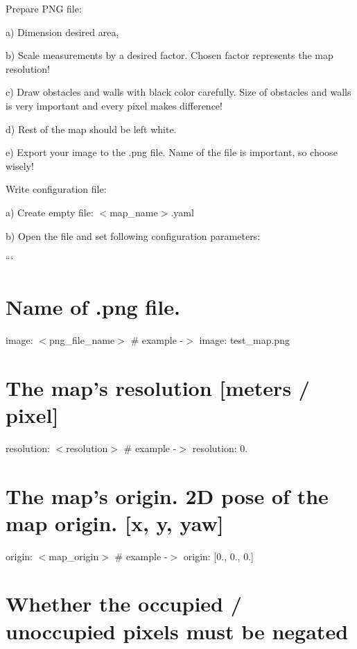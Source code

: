 \begin{DoxyEnumerate}
\item Prepare P\-N\-G file\-:\par
 a) Dimension desired area,\par
 b) Scale measurements by a desired factor. Chosen factor represents the map resolution! \par
 c) Draw obstacles and walls with black color carefully. Size of obstacles and walls is very important and every pixel makes difference!\par
 d) Rest of the map should be left white.\par
 e) Export your image to the .png file. Name of the file is important, so choose wisely!\par

\item Write configuration file\-:\par
 a) Create empty file\-: {\ttfamily $<$map\-\_\-name$>$.yaml}\par
 b) Open the file and set following configuration parameters\-:\par

\end{DoxyEnumerate}

``` \section*{Name of .png file.}

image\-: $<$png\-\_\-file\-\_\-name$>$ \# example -\/$>$ image\-: test\-\_\-map.\-png

\section*{The map's resolution \mbox{[}meters / pixel\mbox{]}}

resolution\-: $<$resolution$>$ \# example -\/$>$ resolution\-: 0.

\section*{The map's origin. 2\-D pose of the map origin. \mbox{[}x, y, yaw\mbox{]}}

origin\-: $<$map\-\_\-origin$>$ \# example -\/$>$ origin\-: \mbox{[}0., 0., 0.\mbox{]}

\section*{Whether the occupied / unoccupied pixels must be negated}

